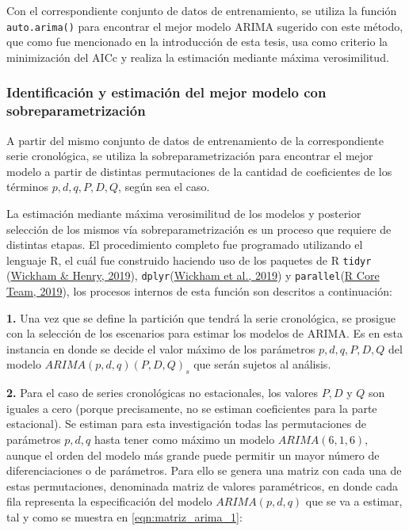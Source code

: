 \documentclass[
]{article}
\begin{document}
Con el correspondiente conjunto de datos de entrenamiento, se utiliza la
función \texttt{auto.arima()} para encontrar el mejor modelo ARIMA
sugerido con este método, que como fue mencionado en la introducción de
esta tesis, usa como criterio la minimización del AICc y realiza la
estimación mediante máxima verosimilitud.

\subsubsection{Identificación y estimación del mejor modelo con sobreparametrización}

A partir del mismo conjunto de datos de entrenamiento de la
correspondiente serie cronológica, se utiliza la sobreparametrización
para encontrar el mejor modelo a partir de distintas permutaciones de la
cantidad de coeficientes de los términos \(p, d, q, P, D, Q\), según sea
el caso.

La estimación mediante máxima verosimilitud de los modelos y posterior
selección de los mismos vía sobreparametrización es un proceso que
requiere de distintas etapas. El procedimiento completo fue programado
utilizando el lenguaje R, el cuál fue construido haciendo uso de los
paquetes de R \texttt{tidyr} (\protect\hyperlink{ref-tidyr}{Wickham \&
Henry, 2019}), \texttt{dplyr}(\protect\hyperlink{ref-dplyr}{Wickham et
al., 2019}) y \texttt{parallel}(\protect\hyperlink{ref-parallel}{R Core
Team, 2019}), los procesos internos de esta función son descritos a
continuación:

\textbf{1.} Una vez que se define la partición que tendrá la serie
cronológica, se prosigue con la selección de los escenarios para estimar
los modelos de ARIMA. Es en esta instancia en donde se decide el valor
máximo de los parámetros \(p,d,q,P,D,Q\) del modelo
\(ARIMA(p,d,q)(P,D,Q)_s\) que serán sujetos al análisis.

\textbf{2.} Para el caso de series cronológicas no estacionales, los
valores \(P,D\) y \(Q\) son iguales a cero (porque precisamente, no se
estiman coeficientes para la parte estacional). Se estiman para esta
investigación todas las permutaciones de parámetros \(p,d,q\) hasta
tener como máximo un modelo \(ARIMA(6,1,6)\), aunque el orden del modelo
más grande puede permitir un mayor número de diferenciaciones o de
parámetros. Para ello se genera una matriz con cada una de estas
permutaciones, denominada matriz de valores paramétricos, en donde cada
fila representa la especificación del modelo \(ARIMA(p,d,q)\) que se va
a estimar, tal y como se muestra en \eqref{eqn:matriz_arima_1}:
\end{document}
